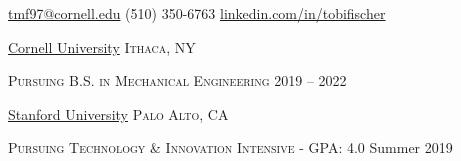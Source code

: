 \documentclass[12pt]{article}
\begin{document}
	\sloppy  %
	
	
	
	\nobreakvspace{0.3em}  %
	
	
	
	\noindent\href{mailto:tmf97@cornell.edu}{tmf97@cornell.edu}\sbull
	(510) 350-6763 \sbull
	\href{https://linkedin.com/in/tobifischer}{linkedin.com/in/tobifischer}\hfill
	
	
	\spacedhrule{0.2em}{-0.7em}  %
	

	\headedsection
	{\href{https://www.mae.cornell.edu/mae}{Cornell University}}
	{\textsc{Ithaca, NY}} {
		\headedsubsection
		{\textsc{Pursuing B.S. in Mechanical Engineering}}
		{2019 -- 2022}{}
		\vspace{-.1em}
		
		\vspace{-1.5em}
		
		\vspace{-.4em}
		
	}
	\headedsection
{\href{https://www.stanford.edu/}{Stanford University}}
{\textsc{Palo Alto, CA}} {
	\headedsubsection
	{\textsc{Pursuing Technology \& Innovation Intensive - GPA: } 4.0}
	{Summer 2019}{}
	\vspace{-.1em}
	
	\vspace{-1.5em}
	
	\vspace{-.4em}
	
}
	
\end{document}
